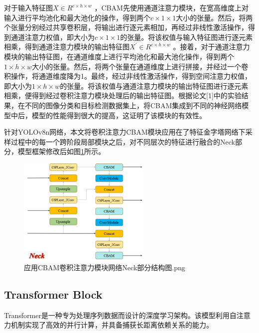 \documentclass[journal]{IEEEtran}
\begin{document}
对于输入特征图$X\in R^{c\times h\times w}$ ，CBAM先使用通道注意力模块，在宽高维度上对输入进行平均池化和最大池化的操作，得到两个$c\times1\times1$大小的张量。然后，将两个张量分别经过共享卷积层，将输出进行逐元素相加，再经过非线性激活操作，得到通道注意力权值，即大小为$c\times1\times1$的张量。将该权值与输入特征图进行逐元素相乘，得到通道注意力模块的输出特征图$X^{\prime}\in R^{c\times h\times w}$ 。接着，对于通道注意力模块的输出特征图，在通道维度上进行平均池化和最大池化操作，得到两个$1\times h\times w$大小的张量。然后，将两个张量在通道维度上进行拼接，并经过一个卷积操作，将通道维度降为1。最终，经过非线性激活操作，得到空间注意力权值，即大小为$1\times h\times w$的张量。将该权值与通道注意力模块的输出特征图进行逐元素相乘，便得到经过卷积注意力模块处理后的输出特征图。根据论文[1]中的实验结果，在不同的图像分类和目标检测数据集上，将CBAM集成到不同的神经网络模型中后，模型的性能得到很大的提高，这证明了该模块的有效性。

针对YOLOv8n网络，本文将卷积注意力CBAM模块应用在了特征金字塔网络下采样过程中的每一个跨阶段局部模块之后，对不同层次的特征进行融合的Neck部分，模型框架修改后如图\ref{fig:Neck}所示。

\begin{figure}
  \centering
  \includegraphics[width=2.5in]{./picture/应用CBAM卷积注意力模块网络Neck部分结构图.png}
  \caption{应用CBAM卷积注意力模块网络Neck部分结构图.png}
  \label{fig:Neck}
\end{figure}

\subsection{Transformer Block}
Transformer\cite{ref2}是一种专为处理序列数据而设计的深度学习架构。该模型利用自注意力机制实现了高效的并行计算，并具备捕获长距离依赖关系的能力。
\end{document}

